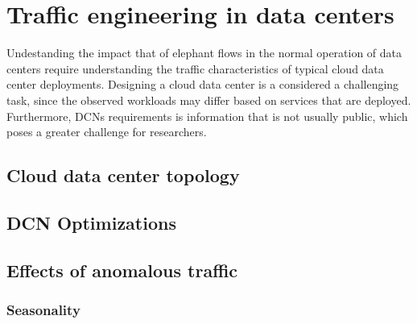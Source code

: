 \chapter {Traffic engineering in data centers}

Undestanding the impact that of elephant flows in the normal operation of data centers require understanding the traffic characteristics of typical cloud data center deployments. Designing a cloud data center is a considered a 
challenging task, since the observed workloads may differ based on services that are deployed. Furthermore, DCNs requirements is information that is not usually public, which poses a greater challenge for researchers.

\section {Cloud data center topology} 
\section {DCN Optimizations} 
\section {Effects of anomalous traffic} 
\subsection {Seasonality} 

